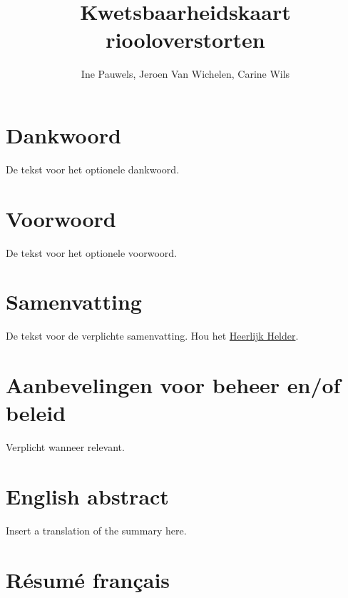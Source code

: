 \documentclass[twoside]{extreport}
\title{Kwetsbaarheidskaart riooloverstorten}
\author{
Ine Pauwels, Jeroen Van Wichelen, Carine Wils
}
\begin{document}
\maketitle
{}



\chapter*{Dankwoord}\label{dankwoord}

De tekst voor het optionele dankwoord.

\chapter*{Voorwoord}\label{voorwoord}

De tekst voor het optionele voorwoord.

\chapter*{Samenvatting}\label{samenvatting}

De tekst voor de verplichte samenvatting. Hou het
\href{https://overheid.vlaanderen.be/communicatie/heerlijk-helder}{Heerlijk
Helder}.

\chapter*{Aanbevelingen voor beheer en/of
beleid}\label{aanbevelingen-voor-beheer-enof-beleid}

Verplicht wanneer relevant.

\benglish

\chapter*{English abstract}\label{english-abstract}

Insert a translation of the summary here. \eenglish

\bfrench

\chapter*{Résumé français}\label{ruxe9sumuxe9-franuxe7ais}
\end{document}
